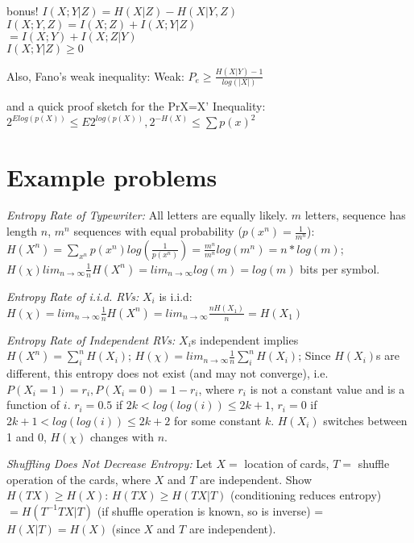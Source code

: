 \documentclass[10pt]{article}
\begin{document}
\begin{tiny}
\begin{multicols}{3}
bonus!
$I(X;Y|Z) = H(X|Z) - H(X|Y,Z)$ \\
$I(X;Y,Z) = I(X;Z) + I(X;Y|Z) $\\
$            = I(X;Y) + I(X;Z|Y) $\\
$I(X;Y|Z) \geq 0$ 

Also,
Fano's weak inequality:
Weak: $P_e \geq \frac{H(X|Y)-1}{log(|X|)}$

and a quick proof sketch for the Pr{X=X'} Inequality:
$2^{Elog(p(X))} \leq E2^{log(p(X))}, 2^{-H(X)} \leq \sum p(x)^2$

\section*{Example problems}

\textit{Entropy Rate of Typewriter:} 
All letters are equally likely. 
$m$ letters, sequence has length $n$, 
$m^n$ sequences with equal probability ($p(x^n) = \frac{1}{m^n}$): 
$H(X^n) = \sum_{x^n} p(x^n) log(\frac{1}{p(x^n)}) =  \frac{m^n}{m^n}log(m^n) = n*log(m)$; $H(\chi) lim_{n \to \infty} \frac{1}{n} H(X^n) = lim_{n \to \infty} log(m) = log(m)$ bits per symbol.

\textit{Entropy Rate of i.i.d. RVs:} 
$X_i$ is i.i.d: 
$H(\chi) = lim_{n \to \infty} \frac{1}{n} H(X^n) = lim_{n \to \infty} \frac{nH(X_1)}{n} = H(X_1)$

\textit{Entropy Rate of Independent RVs:} 
$X_i$s independent implies $H(X^n) = \sum_i^n H(X_i)$; 
$H(\chi) = lim_{n \to \infty} \frac{1}{n} \sum_i^n H(X_i) $; 
Since $H(X_i)$s are different, 
this entropy does not exist (and may not converge), 
i.e. $P(X_i = 1) = r_i, P(X_i = 0) = 1 - r_i$, 
where $r_i$ is not a constant value and is a function of $i$. 
$r_i = 0.5$ if $2k < log(log(i)) \leq 2k + 1$, $r_i = 0$ if $2k + 1 < log(log(i)) \leq 2k +2 $ for some constant $k$. $H(X_i)$ switches between 1 and 0, $H(\chi)$ changes with $n$.

\textit{Shuffling Does Not Decrease Entropy:} 
Let $X =$ location of cards, $T =$ shuffle operation of the cards, 
where $X$ and $T$ are independent. Show $H(TX) \geq H(X)$: $H(TX) \geq H(TX|T)$ (conditioning reduces entropy) $= H(T^{-1}TX|T)$ (if shuffle operation is known, so is inverse) = $H(X|T) = H(X)$ (since $X$ and $T$ are independent).


\end{multicols}
\end{tiny}
\end{document}
